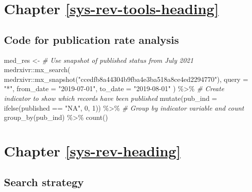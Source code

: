 \documentclass[a4paper, twoside]{templates/ociamthesis}
\newenvironment{Shaded}{\begin{snugshade}}{\end{snugshade}}
\newcommand{\AttributeTok}[1]{\textcolor[rgb]{0.77,0.63,0.00}{#1}}
\newcommand{\CommentTok}[1]{\textcolor[rgb]{0.56,0.35,0.01}{\textit{#1}}}
\newcommand{\DecValTok}[1]{\textcolor[rgb]{0.00,0.00,0.81}{#1}}
\newcommand{\FunctionTok}[1]{\textcolor[rgb]{0.00,0.00,0.00}{#1}}
\newcommand{\NormalTok}[1]{#1}
\newcommand{\OtherTok}[1]{\textcolor[rgb]{0.56,0.35,0.01}{#1}}
\newcommand{\SpecialCharTok}[1]{\textcolor[rgb]{0.00,0.00,0.00}{#1}}
\newcommand{\StringTok}[1]{\textcolor[rgb]{0.31,0.60,0.02}{#1}}
\renewenvironment{Shaded}
{
  \vspace{4pt}%
  \begin{snugshade}%
}{%
  \end{snugshade}%
  \vspace{4pt}%
}
\begin{document}
\hypertarget{appendix-sys-rev-tools}{%
\section{Chapter \ref{sys-rev-tools-heading}}\label{appendix-sys-rev-tools}}

\hypertarget{code-for-publication-rate-analysis}{%
\subsection{Code for publication rate analysis}\label{code-for-publication-rate-analysis}}

\begin{Shaded}
\begin{Highlighting}[]
\NormalTok{med\_res }\OtherTok{\textless{}{-}}
  \CommentTok{\# Use snapshot of published status from July 2021}
\NormalTok{  medrxivr}\SpecialCharTok{::}\FunctionTok{mx\_search}\NormalTok{(}
\NormalTok{    medrxivr}\SpecialCharTok{::}\FunctionTok{mx\_snapshot}\NormalTok{(}\StringTok{"ccedfb8a44304b9fba4e3ba518a8ce4ed2294770"}\NormalTok{),}
    \AttributeTok{query =} \StringTok{"*"}\NormalTok{,}
    \AttributeTok{from\_date =} \StringTok{"2019{-}07{-}01"}\NormalTok{,}
    \AttributeTok{to\_date =} \StringTok{"2019{-}08{-}01"}
\NormalTok{  ) }\SpecialCharTok{\%\textgreater{}\%}
  \CommentTok{\# Create indicator to show which records have been published}
  \FunctionTok{mutate}\NormalTok{(}\AttributeTok{pub\_ind =} \FunctionTok{ifelse}\NormalTok{(published }\SpecialCharTok{==} \StringTok{"NA"}\NormalTok{, }\DecValTok{0}\NormalTok{, }\DecValTok{1}\NormalTok{)) }\SpecialCharTok{\%\textgreater{}\%}
  \CommentTok{\# Group by indicator variable and count}
  \FunctionTok{group\_by}\NormalTok{(pub\_ind) }\SpecialCharTok{\%\textgreater{}\%}
  \FunctionTok{count}\NormalTok{() }
\end{Highlighting}
\end{Shaded}

\hypertarget{appendix-sys-rev}{%
\section{Chapter \ref{sys-rev-heading}}\label{appendix-sys-rev}}

\hypertarget{appendix-search-strategy}{%
\subsection{Search strategy}\label{appendix-search-strategy}}
\end{document}
